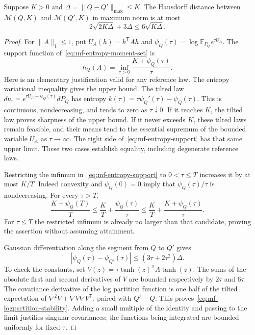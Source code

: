 \begin{lemma}
\label{lem:mf-entropy-stability}
Suppose $K>0$ and $\Delta=\|Q-Q'\|_{\max}\leq K$.
The Hausdorff distance between $\mathcal M(Q,K)$ and
$\mathcal M(Q',K)$ in maximum norm is at most
\begin{equation}
 2\sqrt{2K\Delta}+3\Delta\leq6\sqrt{K\Delta}.
 \label{eq:mf-entropy-stability}
\end{equation}
\end{lemma}
\begin{proof}
For $\|A\|_1\leq1$, put $U_A(h)=h^{\mathsf T}Ah$ and
$\psi_Q(\tau)=\log\mathbb E_{P_Q}e^{\tau U_A}$.
The support function of~\eqref{eq:mf-entropy-moment-set} is
\begin{equation}
 h_Q(A)=\inf_{\tau>0}\frac{K+\psi_Q(\tau)}\tau.
 \label{eq:mf-entropy-support}
\end{equation}
Here is an elementary justification valid for any reference law.
The entropy variational inequality gives the upper bound.
The tilted law $d\nu_\tau=e^{\tau U_A-\psi_Q(\tau)}dP_Q$ has
entropy $k(\tau)=\tau\psi_Q'(\tau)-\psi_Q(\tau)$.
This is continuous, nondecreasing, and tends to zero as
$\tau\downarrow0$.  If it reaches $K$, the tilted law proves
sharpness of the upper bound.  If it never exceeds $K$, these tilted
laws remain feasible, and their means tend to the essential supremum
of the bounded variable $U_A$ as $\tau\to\infty$.
The right side of~\eqref{eq:mf-entropy-support} has that same upper
limit.  These two cases establish equality, including degenerate
reference laws.

Restricting the infimum in~\eqref{eq:mf-entropy-support} to
$0<\tau\leq T$ increases it by at most $K/T$.
Indeed convexity and $\psi_Q(0)=0$ imply that
$\psi_Q(\tau)/\tau$ is nondecreasing.  For every $\tau>T$,
\[
 \frac{K+\psi_Q(T)}T
 \leq\frac KT+\frac{\psi_Q(\tau)}\tau
 \leq\frac KT+\frac{K+\psi_Q(\tau)}\tau.
\]
For $\tau\leq T$ the restricted infimum is already no larger than
that candidate, proving the assertion without assuming attainment.

Gaussian differentiation along the segment from $Q$ to $Q'$ gives
\begin{equation}
 |\psi_Q(\tau)-\psi_{Q'}(\tau)|
       \leq(3\tau+2\tau^2)\Delta.
 \label{eq:mf-logpartition-stability}
\end{equation}
To check the constants, set
$V(z)=\tau\tanh(z)^{\mathsf T}A\tanh(z)$.
The sums of the absolute first and second derivatives of $V$ are
bounded respectively by $2\tau$ and $6\tau$.
The covariance derivative of the log partition function is one half
of the tilted expectation of $\nabla^2V+\nabla V\nabla V^{\mathsf T}$,
paired with $Q'-Q$.  This proves~\eqref{eq:mf-logpartition-stability}.
Adding a small multiple of the identity and passing to the limit
justifies singular covariances; the functions being integrated are
bounded uniformly for fixed $\tau$.


\end{proof}
